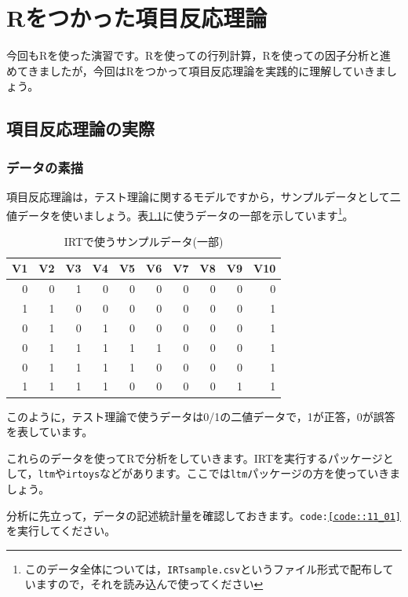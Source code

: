\documentclass{ltjsbook}
\begin{document}
 
\chapter{Rをつかった項目反応理論} 
\label{chapter11} 

今回もRを使った演習です。Rを使っての行列計算，Rを使っての因子分析と進めてきましたが，今回はRをつかって項目反応理論を実践的に理解していきましょう。

\section{項目反応理論の実際}
\subsection{データの素描}
項目反応理論は，テスト理論に関するモデルですから，サンプルデータとして二値データを使いましょう。表\ref{tbl::11_01}に使うデータの一部を示しています\footnote{このデータ全体については，\texttt{IRTsample.csv}というファイル形式で配布していますので，それを読み込んで使ってください}。
\begin{table}
    \caption{IRTで使うサンプルデータ(一部)}
    \centering
    \begin{tabular}[t]{rrrrrrrrrr}
    \hline
    V1 & V2 & V3 & V4 & V5 & V6 & V7 & V8 & V9 & V10\\
    \hline
    0 & 0 & 1 & 0 & 0 & 0 & 0 & 0 & 0 & 0\\
    1 & 1 & 0 & 0 & 0 & 0 & 0 & 0 & 0 & 1\\
    0 & 1 & 0 & 1 & 0 & 0 & 0 & 0 & 0 & 1\\
    0 & 1 & 1 & 1 & 1 & 1 & 0 & 0 & 0 & 1\\
    0 & 1 & 1 & 1 & 1 & 0 & 0 & 0 & 0 & 1\\
    1 & 1 & 1 & 1 & 0 & 0 & 0 & 0 & 1 & 1\\
    \hline
    \end{tabular}
    \label{tbl::11_01}
\end{table}

このように，テスト理論で使うデータは0/1の二値データで，1が正答，0が誤答を表しています。

これらのデータを使ってRで分析をしていきます。IRTを実行するパッケージとして，\texttt{ltm}\citep{ltm}や\texttt{irtoys}\citep{partchev2017package}などがあります。ここでは\texttt{ltm}パッケージの方を使っていきましょう。

分析に先立って，データの記述統計量を確認しておきます。\texttt{code:\ref{code::11_01}}を実行してください。
\end{document}

